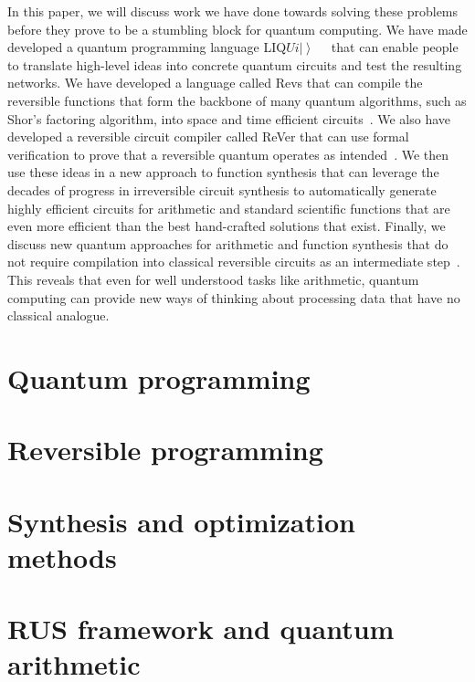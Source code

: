 \documentclass[conference]{IEEEtran}
\newcommand{\ket}[1]{\left| #1\right\rangle}        %
\newcommand{\Liquid}{LIQ$Ui\ket{}$\ }
\begin{document}
In this paper, we will discuss work we have done towards solving these problems before they prove to be a stumbling block for quantum computing.  We have made developed a quantum programming language \Liquid~\cite{wecker2014liqui} that can enable people to translate high-level ideas into concrete quantum circuits and test the resulting networks.  We have developed a   language called Revs that can compile the reversible functions that form the backbone of many quantum algorithms, such as Shor's factoring algorithm, into space and time efficient circuits~\cite{parent2015reversible}.  We also have developed a reversible circuit compiler called ReVer that can use formal verification to prove that a reversible quantum operates as intended~\cite{amy2016verified}.  We then use these ideas in a new approach to function synthesis that can leverage the decades of progress in irreversible circuit synthesis to automatically generate highly efficient circuits for arithmetic and standard scientific functions that are even more efficient than the best hand-crafted solutions that exist.  Finally, we discuss new quantum approaches for arithmetic and function synthesis that do not require compilation into classical reversible circuits as an intermediate step~\cite{WR16}.  This reveals that even for well understood tasks like arithmetic, quantum computing can provide new ways of thinking about processing data that have no classical analogue.

\cite{PRS15}
\section{Quantum programming} %

\section{Reversible programming} %

\section{Synthesis and optimization methods}%

\section{RUS framework and quantum arithmetic} %
\end{document}
